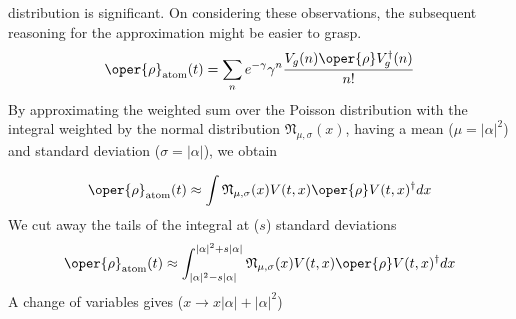 distribution is significant. On considering these observations, the subsequent reasoning for the approximation might be easier to grasp.
\begin{equation}
\oper{\rho}_{\text{atom}}(t) = \sum_n e^{-\gamma} \gamma^n \frac{V_g(n)\oper{\rho} V_g^\dagger(n)}{n!}
\end{equation}
By approximating the weighted sum over the Poisson distribution with the integral weighted by 
the normal distribution \( \mathfrak{N}_{\mu, \sigma}(x)\), having a mean (\( \mu =  |\alpha|^2 \)) 
and standard deviation (\( \sigma = |\alpha| \)), we obtain

\begin{equation}
    \oper{\rho}_{\text{atom}}(t)\approx \int \mathfrak{N}_{\mu, \sigma}(x) V(t, x) \oper{\rho} V(t, x)^{\dagger} dx
\end{equation}
We cut away the tails of the integral at (\( s \)) standard deviations
\begin{equation}
    \oper{\rho}_{\text{atom}}(t)\approx \int_{|\alpha|^2 - s|\alpha|}^{|\alpha|^2 + s|\alpha|}\mathfrak{N}_{\mu, \sigma}(x) V(t, x) \oper{\rho} V(t, x)^{\dagger} dx
\end{equation}
A change of variables gives (\( x \to x|\alpha| + |\alpha|^2 \))

